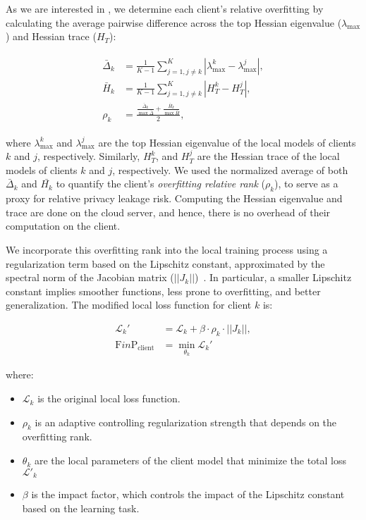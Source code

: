 As we are interested in \sysname, we determine each client's relative overfitting by calculating the average pairwise difference across the top Hessian eigenvalue ($\lambda_{\text{max}}$) and Hessian trace ($H_{T}$):

\begin{align}
\begin{split}
\bar{\Delta}_k &= \frac{1}{K-1} \sum_{j=1, j\neq k}^{K} |\lambda_{\text{max}}^k - \lambda_{\text{max}}^j|, \\    \bar{H}_k &= \frac{1}{K-1} \sum_{j=1, j\neq k}^{K} |H_T^k - H_T^j|, \\  \rho_k &= \frac{\frac{\bar{\Delta}_k}{\max{\bar{\Delta} }} + \frac{\bar{H}_k}{\max{\bar{H} }} }{2},
\end{split} \label{eq:hessian}
\end{align}

where $\lambda_{\text{max}}^k$ and $\lambda_{\text{max}}^j$ are the top Hessian eigenvalue of the local models of clients $k$ and $j$, respectively.  Similarly, $H_T^k$, and $H_T^j$ are the Hessian trace of the local models of clients $k$ and $j$, respectively. We used the normalized average of both $\bar{\Delta}_k$ and $\bar{H_k}$ to quantify the client's \textit{overfitting relative rank} ($\rho_k$), to serve as a proxy for relative privacy leakage risk. Computing the Hessian eigenvalue and trace are done on the cloud server, and hence, there is no overhead of their computation on the client.


We incorporate this overfitting rank into the local training process using a regularization term based on the Lipschitz constant, approximated by the spectral norm of the Jacobian matrix ($||J_k||$)~\cite{liu2020simple}. In particular, a smaller Lipschitz constant implies smoother functions, less prone to overfitting, and better generalization. The modified local loss function for client $k$ is:

\begin{align}\label{eq:finpclient}
\mathcal{L}_k' &= \mathcal{L}_k + \beta \cdot \rho_k \cdot ||J_k||, \nonumber \\
\text{F}in\text{P}_\text{client} &= \min_{\theta_k} {\mathcal{L}_k'}
\end{align}

where:

\begin{itemize}
    \item $\mathcal{L}_k$ is the original local loss function.
    \item $\rho_k$ is an adaptive controlling regularization strength that depends on the overfitting rank.
    \item $\theta_k$ are the local parameters of the client model that minimize the total loss $\mathcal{L}'_k$
    \item  $\beta$ is the impact factor, which controls the impact of the Lipschitz constant based on the learning task.
\end{itemize}


